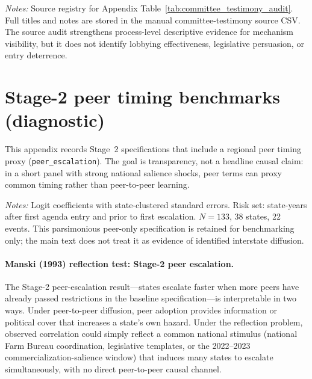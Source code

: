 \documentclass[12pt]{article}
\begin{document}
\begin{appendices}
{\scriptsize
\renewcommand{\arraystretch}{0.92}

}

\noindent\footnotesize\textit{Notes:} Source registry for Appendix Table~\ref{tab:committee_testimony_audit}.  Full titles and notes are stored in the manual committee-testimony source CSV.  The source audit strengthens process-level descriptive evidence for mechanism visibility, but it does not identify lobbying effectiveness, legislative persuasion, or entry deterrence.
\normalsize

\section{Stage-2 peer timing benchmarks (diagnostic)}
\label{app:peer_diagnostics}

This appendix records Stage~2 specifications that include a regional peer timing proxy (\texttt{peer\_escalation}).  The goal is transparency, not a headline causal claim: in a short panel with strong national salience shocks, peer terms can proxy common timing rather than peer-to-peer learning.

\begin{table}[htbp]
\centering
\begin{threeparttable}
\caption{Stage 2: Discrete-Time Hazard of Escalation}
\label{tab:stage2}

\begin{tablenotes}[flushleft]
\footnotesize
\item \textit{Notes:} Logit coefficients with state-clustered standard errors.  Risk set: state-years after first agenda entry and prior to first escalation.  $N = 133$, 38 states, 22 events.  This parsimonious peer-only specification is retained for benchmarking only; the main text does not treat it as evidence of identified interstate diffusion.
\end{tablenotes}
\end{threeparttable}
\end{table}

\paragraph{Manski (1993) reflection test: Stage-2 peer escalation.}
The Stage-2 peer-escalation result---states escalate faster when more peers have already passed restrictions in the baseline specification---is interpretable in two ways.  Under peer-to-peer diffusion, peer adoption provides information or political cover that increases a state's own hazard.  Under the \citet{manski1993} reflection problem, observed correlation could simply reflect a common national stimulus (national Farm Bureau coordination, legislative templates, or the 2022--2023 commercialization-salience window) that induces many states to escalate simultaneously, with no direct peer-to-peer causal channel.


\end{appendices}
\end{document}
